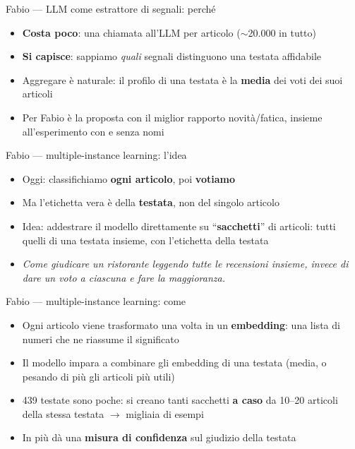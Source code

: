 \documentclass[aspectratio=169]{beamer}
\newcommand{\hl}[1]{\textbf{#1}}
\begin{document}
\begin{frame}{Fabio --- LLM come estrattore di segnali: perch\'e}
  \vfill
  \begin{itemize}[<+->]
    \setlength\itemsep{0.8em}
    \item \hl{Costa poco}: una chiamata all'LLM per articolo ($\sim$20.000 in tutto)
    \item \hl{Si capisce}: sappiamo \emph{quali} segnali distinguono una testata affidabile
    \item Aggregare \`e naturale: il profilo di una testata \`e la \hl{media} dei voti dei suoi articoli
    \item Per Fabio \`e la proposta con il miglior rapporto novit\`a/fatica, insieme all'esperimento con e senza nomi
  \end{itemize}
  \vfill
\end{frame}

\begin{frame}{Fabio --- multiple-instance learning: l'idea}
  \vfill
  \begin{itemize}[<+->]
    \setlength\itemsep{0.8em}
    \item Oggi: classifichiamo \hl{ogni articolo}, poi \hl{votiamo}
    \item Ma l'etichetta vera \`e della \hl{testata}, non del singolo articolo
    \item Idea: addestrare il modello direttamente su ``\hl{sacchetti}'' di articoli: tutti quelli di una testata insieme, con l'etichetta della testata
    \item[] {\small\itshape Come giudicare un ristorante leggendo tutte le recensioni insieme, invece di dare un voto a ciascuna e fare la maggioranza.}
  \end{itemize}
  \vfill
\end{frame}

\begin{frame}{Fabio --- multiple-instance learning: come}
  \vfill
  \begin{itemize}[<+->]
    \setlength\itemsep{0.8em}
    \item Ogni articolo viene trasformato una volta in un \hl{embedding}: una lista di numeri che ne riassume il significato
    \item Il modello impara a combinare gli embedding di una testata (media, o pesando di pi\`u gli articoli pi\`u utili)
    \item 439 testate sono poche: si creano tanti sacchetti \hl{a caso} da 10--20 articoli della stessa testata $\rightarrow$ migliaia di esempi
    \item In pi\`u d\`a una \hl{misura di confidenza} sul giudizio della testata
  \end{itemize}
  \vfill
\end{frame}
\end{document}
